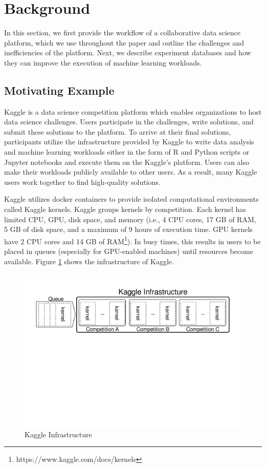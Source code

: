 \section{Background} \label{sec-background}
In this section, we first provide the workflow of a collaborative data science platform, which we use throughout the paper and outline the challenges and inefficiencies of the platform.
Next, we describe experiment databases and how they can improve the execution of machine learning workloads.

\subsection{Motivating Example}\label{subsec-motivational-example}
Kaggle is a data science competition platform which enables organizations to host data science challenges.
Users participate in the challenges, write solutions, and submit these solutions to the platform.
To arrive at their final solutions, participants utilize the infrastructure provided by Kaggle to write data analysis and machine learning workloads either in the form of R and Python scripts  or Jupyter notebooks  and execute them on the Kaggle's platform.
Users can also make their workloads publicly available to other users.
As a result, many Kaggle users work together to find high-quality solutions.

Kaggle utilizes docker containers to provide isolated computational environments called Kaggle kernels.
Kaggle groups kernels by competition.
Each kernel has limited CPU, GPU, disk space, and memory (i.e., 4 CPU cores, 17 GB of RAM, 5 GB of disk space, and a maximum of 9 hours of execution time. GPU kernels have 2 CPU cores and 14 GB of RAM\footnote{https://www.kaggle.com/docs/kernels}).
In busy times, this results in users to be placed in queues (especially for GPU-enabled machines) until resources become available.
Figure \ref{example-use-case} shows the infrastructure of Kaggle.

\begin{figure}
\centering
\includegraphics[width=\columnwidth]{../images/example-use-case}
\caption{Kaggle Infrastructure}
\label{example-use-case}
\end{figure}


